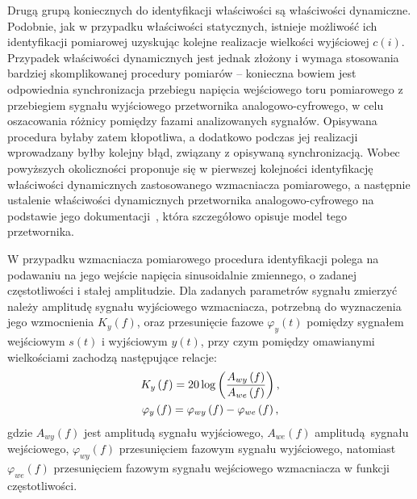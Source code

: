 Drugą grupą koniecznych do identyfikacji właściwości są właściwości dynamiczne. Podobnie, jak w przypadku właściwości statycznych, istnieje możliwość ich identyfikacji pomiarowej uzyskując kolejne realizacje wielkości wyjściowej $c(i)$. Przypadek właściwości dynamicznych jest jednak złożony i wymaga stosowania bardziej skomplikowanej procedury pomiarów -- konieczna bowiem jest odpowiednia synchronizacja przebiegu napięcia wejściowego toru pomiarowego z przebiegiem sygnału wyjściowego przetwornika analogowo-cyfrowego, w celu oszacowania różnicy pomiędzy fazami analizowanych sygnałów. Opisywana procedura byłaby zatem kłopotliwa, a dodatkowo podczas jej realizacji wprowadzany byłby kolejny błąd, związany z opisywaną synchronizacją. Wobec powyższych okoliczności proponuje się w pierwszej kolejności identyfikację właściwości dynamicznych zastosowanego wzmacniacza pomiarowego, a następnie ustalenie właściwości dynamicznych przetwornika analogowo-cyfrowego na podstawie jego dokumentacji~\cite{stm_f411}, która szczegółowo opisuje model tego przetwornika.

W przypadku wzmacniacza pomiarowego procedura identyfikacji polega na podawaniu na jego wejście napięcia sinusoidalnie zmiennego, o zadanej częstotliwości i stałej amplitudzie. Dla zadanych parametrów sygnału zmierzyć należy amplitudę sygnału wyjściowego wzmacniacza, potrzebną do wyznaczenia jego wzmocnienia $K_{y}(f)$, oraz przesunięcie fazowe $\varphi_{y}(t)$ pomiędzy sygnałem wejściowym $s(t)$ i wyjściowym $y(t)$, przy czym pomiędzy omawianymi wielkościami zachodzą następujące relacje:
\begin{gather}
K_{y} \left(f\right) = 20 \log \left( \frac{A_{wy} \left(f\right)}{A_{we} \left(f\right)} \right) \label{eq:pom_dyn_amp}, \\
\varphi_{y} \left(f\right) = \varphi_{wy} \left(f\right) - \varphi_{we} \left(f\right) \label{eq:pom_dyn_phi},
\end{gather}
gdzie $A_{wy}(f)$ jest amplitudą sygnału wyjściowego, $A_{we}(f)$ amplitudą sygnału wejściowego, $\varphi_{wy}(f)$ przesunięciem fazowym sygnału wyjściowego, natomiast $\varphi_{we}(f)$ przesunięciem fazowym sygnału wejściowego wzmacniacza w funkcji częstotliwości.

